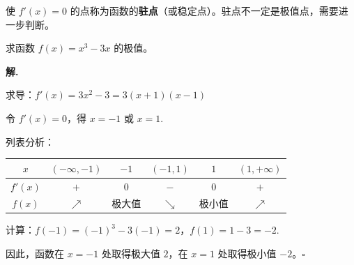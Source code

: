 \begin{note}
使 $f'(x) = 0$ 的点称为函数的\textbf{驻点}（或稳定点）。驻点不一定是极值点，需要进一步判断。
\end{note}

\begin{example}
求函数 $f(x) = x^3 - 3x$ 的极值。
\end{example}

\textbf{解.}

求导：$f'(x) = 3x^2 - 3 = 3(x+1)(x-1)$

令 $f'(x) = 0$，得 $x = -1$ 或 $x = 1$.

列表分析：
\begin{center}
\begin{tabular}{c|ccccc}
\toprule
$x$ & $(-\infty, -1)$ & $-1$ & $(-1, 1)$ & $1$ & $(1, +\infty)$ \\
\midrule
$f'(x)$ & $+$ & $0$ & $-$ & $0$ & $+$ \\
$f(x)$ & $\nearrow$ & 极大值 & $\searrow$ & 极小值 & $\nearrow$ \\
\bottomrule
\end{tabular}
\end{center}

计算：$f(-1) = (-1)^3 - 3(-1) = 2$，$f(1) = 1 - 3 = -2$.

因此，函数在 $x = -1$ 处取得极大值 $2$，在 $x = 1$ 处取得极小值 $-2$。\hfill $\square$
